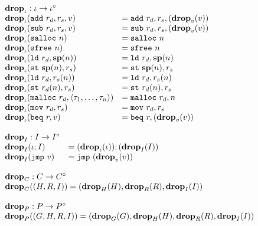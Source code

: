 {\[\begin{array}{l}
\begin{array}{ll}
\rlap{$\mathbf{drop}_\iota : \iota -> \iota^\circ$} \\
\drop{\iota}{\mathtt{add}\ r_d, r_s, v} &= \mathtt{add}\ r_d, r_s, (\drop{v}{v}) \\
\drop{\iota}{\mathtt{sub}\ r_d, r_s, v} &= \mathtt{sub}\ r_d, r_s, (\drop{v}{v}) \\
\drop{\iota}{\mathtt{salloc}\ n} &= \mathtt{salloc}\ n \\
\drop{\iota}{\mathtt{sfree}\ n} &= \mathtt{sfree}\ n \\
\drop{\iota}{\mathtt{ld}\ r_d, \mathbf{sp}(n)} &= \mathtt{ld}\ r_d, \mathbf{sp}(n) \\
\drop{\iota}{\mathtt{st}\ \mathbf{sp}(n), r_s} &= \mathtt{st}\ \mathbf{sp}(n), r_s \\
\drop{\iota}{\mathtt{ld}\ r_d, r_s(n)} &= \mathtt{ld}\ r_d, r_s(n) \\
\drop{\iota}{\mathtt{st}\ r_d(n), r_s} &= \mathtt{st}\ r_d(n), r_s \\
\drop{\iota}{\mathtt{malloc}\ r_d, \langle \tau_1, \dots, \tau_n \rangle} &= \mathtt{malloc}\ r_d, n \\
\drop{\iota}{\mathtt{mov}\ r_d, r_s} &= \mathtt{mov}\ r_d, r_s \\
\drop{\iota}{\mathtt{beq}\ r, v} &= \mathtt{beq}\ r, (\drop{v}{v}) \\
\end{array} \\\\

\begin{array}{ll}
\mathbf{drop}_I : I -> I^\circ \\
\drop{I}{\iota ; I} &= (\drop{\iota}{\iota}) ; (\drop{I}{I}) \\
\drop{I}{\mathtt{jmp}\ v} &= \mathtt{jmp}\ (\drop{v}{v})
\end{array} \\\\

\begin{array}{l}
\mathbf{drop}_C : C -> C^\circ \\
\drop{C}{(H, R, I)} = (\drop{H}{H}, \drop{R}{R}, \drop{I}{I}) \\\\

\mathbf{drop}_P : P -> P^\circ \\
\drop{P}{(G, H, R, I)} = (\drop{G}{G}, \drop{H}{H}, \drop{R}{R}, \drop{I}{I})
\end{array} \\\\

\end{array}\]
}
